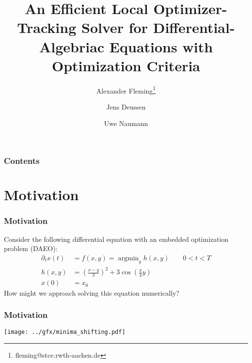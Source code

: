 \documentclass[10pt]{beamer}
\DeclareMathOperator*{\argmin}{\arg\min}
\begin{document}
\title[AD2024, Chicago, Sep 16-19, 2024]{{\bf An Efficient Local Optimizer-Tracking Solver for Differential-Algebriac Equations with Optimization Criteria}}
\author[]{Alexander Fleming\footnote{\scriptsize fleming@stce.rwth-aachen.de} \and Jens Deussen \and Uwe Naumann}
		
\begin{frame}[plain]
\titlepage
\end{frame}

\begin{frame}
	\frametitle{Contents}
	\tableofcontents
\end{frame}

\section{Motivation}

\begin{frame}
\frametitle{Motivation}
\vfill
	Consider the following differential equation with an embedded optimization problem (DAEO):
	\begin{equation}
		\label{eq:newtonian-daeo}
		\begin{aligned}
		\partial_t x(t) &= f(x, y) = \argmin_y h(x, y) \qquad 0<t<T \\
		h(x, y) &= \left(\frac{x-y}{3}\right)^2 + 3\cos(\frac{\pi}{4}y)\\
		x(0) &= x_0
		\end{aligned}
	\end{equation}
\vfill
How might we approach solving this equation numerically?
\vfill
\end{frame}

\begin{frame}
	\frametitle{Motivation}
	\begin{center}
		\texttt{[image: ../gfx/minima\_shifting.pdf]}
	\end{center}
\end{frame}
\end{document}
